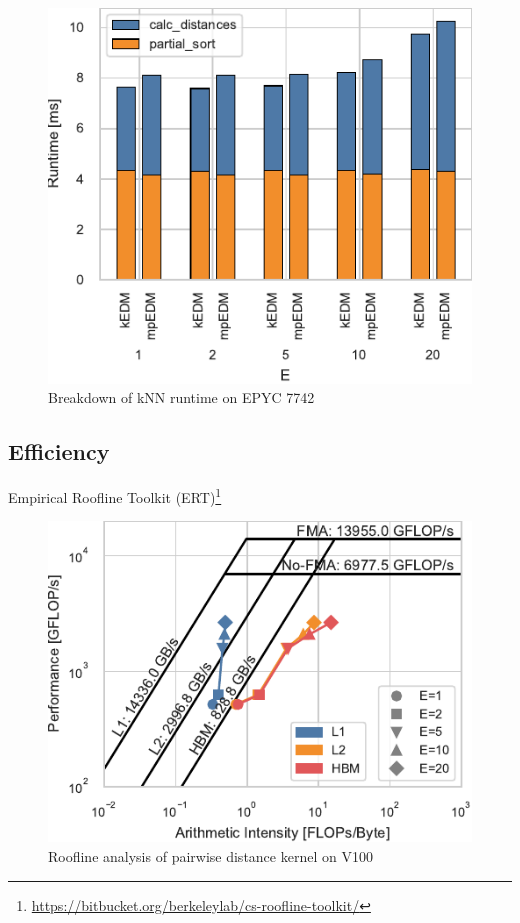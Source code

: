 \documentclass[conference]{IEEEtran}
\begin{document}
\begin{figure}
    \centering
    \includegraphics{figs/breakdown_epyc}
    \caption{Breakdown of kNN runtime on EPYC 7742}%
    \label{fig:architecture}
\end{figure}

\subsection{Efficiency}

Empirical Roofline Toolkit (ERT)\footnote{\url{https://bitbucket.org/berkeleylab/cs-roofline-toolkit/}}

\begin{figure}
    \centering
    \includegraphics{figs/roofline_distances_v100}
    \caption{Roofline analysis of pairwise distance kernel on V100}%
    \label{fig:architecture}
\end{figure}
\end{document}
